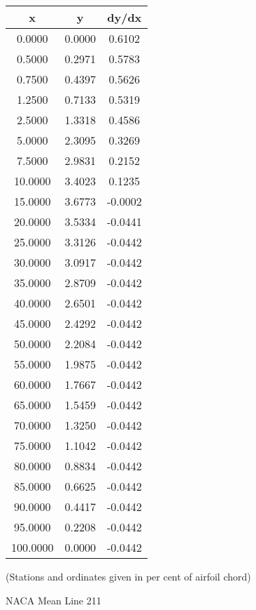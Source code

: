 \documentclass[11pt]{book}
\begin{document}
 \vspace{8mm}
 \begin{tabular}{|c|c|c|}  \hline
 x & y & dy/dx \\
 \hline
0.0000 & 0.0000 & 0.6102 \\
0.5000 & 0.2971 & 0.5783 \\
0.7500 & 0.4397 & 0.5626 \\
1.2500 & 0.7133 & 0.5319 \\
2.5000 & 1.3318 & 0.4586 \\
5.0000 & 2.3095 & 0.3269 \\
7.5000 & 2.9831 & 0.2152 \\
10.0000 & 3.4023 & 0.1235 \\
15.0000 & 3.6773 & -0.0002 \\
20.0000 & 3.5334 & -0.0441 \\
25.0000 & 3.3126 & -0.0442 \\
30.0000 & 3.0917 & -0.0442 \\
35.0000 & 2.8709 & -0.0442 \\
40.0000 & 2.6501 & -0.0442 \\
45.0000 & 2.4292 & -0.0442 \\
50.0000 & 2.2084 & -0.0442 \\
55.0000 & 1.9875 & -0.0442 \\
60.0000 & 1.7667 & -0.0442 \\
65.0000 & 1.5459 & -0.0442 \\
70.0000 & 1.3250 & -0.0442 \\
75.0000 & 1.1042 & -0.0442 \\
80.0000 & 0.8834 & -0.0442 \\
85.0000 & 0.6625 & -0.0442 \\
90.0000 & 0.4417 & -0.0442 \\
95.0000 & 0.2208 & -0.0442 \\
100.0000 & 0.0000 & -0.0442 \\
 \hline
 \end{tabular}
 \vspace{8mm}

(Stations and ordinates given in per cent of airfoil chord)

 \newpage
 \label{ml211}
 \begin{Large}
 NACA Mean Line 211
 \end{Large}
  
\end{document}
